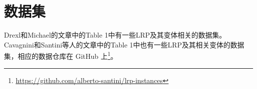 \documentclass[fontset=none]{ctexart}
\begin{document}
\clearpage


\appendix

\section{数据集}

Drexl和Michael的文章中的Table 1中有一些LRP及其变体相关的数据集\cite{drexlSurveyVariantsExtensions2015, schneiderSurveyStandardLocationrouting2017}。Cavagnini和Santini等人的文章中的Table 1中也有一些LRP及其相关变体的数据集\cite{cavagniniRecentDevelopmentsLocationrouting2026}，相应的数据仓库在 GitHub 上\footnote{\url{https://github.com/alberto-santini/lrp-instances}}。
\end{document}
